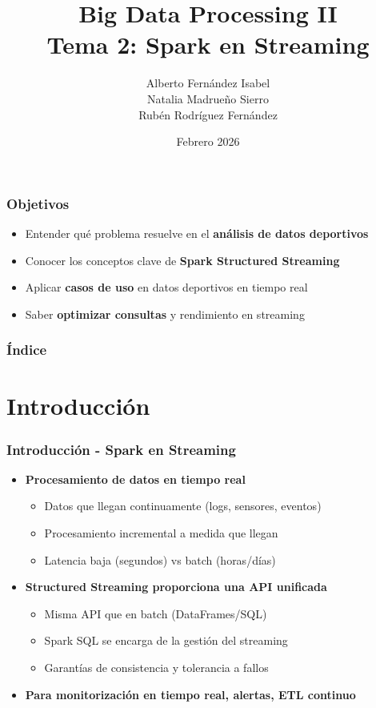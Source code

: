 \documentclass[aspectratio=169]{beamer}
\institute[URJC]{DSLAB}
\author[Big Data Processing II]{
	Alberto Fernández Isabel \\
	Natalia Madrueño Sierro \\
	Rubén Rodríguez Fernández \\
}
\title[Tema 2: Spark en Streaming]{
	Big Data Processing II \\ \vspace{0.2em}
	\large{Tema 2: Spark en Streaming}
}
\date{Febrero 2026}
\begin{document}
\begin{frame}
  \titlepage
\end{frame}

\begin{frame}
\frametitle{Objetivos}
	\begin{itemize}
		\item Entender qué problema resuelve en el \textbf{análisis de datos deportivos}
		\item Conocer los conceptos clave de \textbf{Spark Structured Streaming}
		\item Aplicar \textbf{casos de uso} en datos deportivos en tiempo real
		\item Saber \textbf{optimizar consultas} y rendimiento en streaming
	\end{itemize}
\end{frame}

\begin{frame}
\frametitle{Índice}
	\tableofcontents
\end{frame}

\section{Introducción}

\begin{frame}\frametitle{Introducción - Spark en Streaming}
	\begin{itemize}
		\item \textbf{Procesamiento de datos en tiempo real}
		\begin{itemize}
			\item Datos que llegan continuamente (logs, sensores, eventos)
			\item Procesamiento incremental a medida que llegan
			\item Latencia baja (segundos) vs batch (horas/días)
		\end{itemize}

		\vspace{1em}

		\item \textbf{Structured Streaming proporciona una API unificada}
		\begin{itemize}
			\item Misma API que en batch (DataFrames/SQL)
			\item Spark SQL se encarga de la gestión del streaming
			\item Garantías de consistencia y tolerancia a fallos
		\end{itemize}

    \vspace{1em}

    \item \textbf{Para monitorización en tiempo real, alertas, ETL continuo}
	\end{itemize}
\end{frame}
\end{document}
